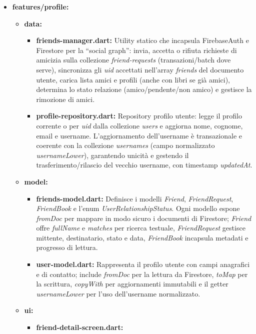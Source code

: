 \documentclass{article}
\begin{document}
\begin{itemize}
\begin{itemize}
  \end{itemize}
  \item \textbf{features/profile:}
  \begin{itemize}
    \item \textbf{data:}
    \begin{itemize}
      \item \textbf{friends-manager.dart:} Utility statico che incapsula FirebaseAuth e Firestore per la “social graph”: invia, accetta o rifiuta richieste di amicizia sulla collezione \textit{friend-requests} (transazioni/batch dove serve), sincronizza gli \textit{uid} accettati nell’array \textit{friends} del documento utente, carica lista amici e profili (anche con libri se già amici), determina lo stato relazione (amico/pendente/non amico) e gestisce la rimozione di amici.
      \item \textbf{profile-repository.dart:} Repository profilo utente: legge il profilo corrente o per \textit{uid} dalla collezione \textit{users} e aggiorna nome, cognome, email e username. L’aggiornamento dell’username è transazionale e coerente con la collezione \textit{usernames} (campo normalizzato \textit{usernameLower}), garantendo unicità e gestendo il trasferimento/rilascio del vecchio username, con timestamp \textit{updatedAt}.
    \end{itemize}
    \item \textbf{model:}
    \begin{itemize}
      \item \textbf{friends-model.dart:}
      Definisce i modelli \textit{Friend}, \textit{FriendRequest}, \textit{FriendBook} e l’enum \textit{UserRelationshipStatus}. Ogni modello espone \textit{fromDoc} per mappare in modo sicuro i documenti di Firestore; \textit{Friend} offre \textit{fullName} e \textit{matches} per ricerca testuale, \textit{FriendRequest} gestisce mittente, destinatario, stato e data, \textit{FriendBook} incapsula metadati e progresso di lettura.
      \item \textbf{user-model.dart:}
      Rappresenta il profilo utente con campi anagrafici e di contatto; include \textit{fromDoc} per la lettura da Firestore, \textit{toMap} per la scrittura, \textit{copyWith} per aggiornamenti immutabili e il getter \textit{usernameLower} per l’uso dell’username normalizzato.
    \end{itemize}
    \item \textbf{ui:}
    \begin{itemize}
      \item \textbf{friend-detail-screen.dart:}

\end{itemize}
\end{itemize}
\end{itemize}
\end{document}
